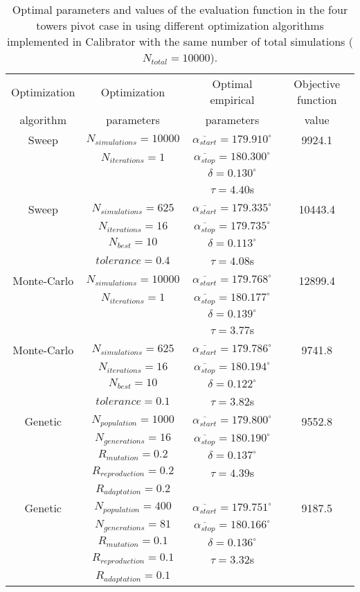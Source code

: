 \documentclass[review,authoryear]{elsarticle}
\newcommand{\TABLE}[5]
{
	\begin{table}[ht!]
		\centering
		\caption{#4.\label{#5}}
		#1
		\begin{tabular}{#2}
			#3
		\end{tabular}
	\end{table}
}
\begin{document}
\TABLE{\scriptsize}{cccc}
{
	Optimization & Optimization & Optimal empirical & Objective function
	\\ algorithm & parameters & parameters & value
	\\ \hline
	Sweep & $N_{simulations}=10000$ & $\overline{\alpha_{start}}=179.910^\circ$
	& 9924.1
	\\ & $N_{iterations}=1$ & $\overline{\alpha_{stop}}=180.300^\circ$
	\\ & & $\delta=0.130^\circ$
	\\ & & $\tau=4.40$s
	\\ \hline
	Sweep & $N_{simulations}=625$ & $\overline{\alpha_{start}}=179.335^\circ$
	& 10443.4
	\\ & $N_{iterations}=16$ & $\overline{\alpha_{stop}}=179.735^\circ$
	\\ & $N_{best}=10$ & $\delta=0.113^\circ$
	\\ & $tolerance=0.4$ & $\tau=4.08$s
	\\ \hline
	Monte-Carlo & $N_{simulations}=10000$
	& $\overline{\alpha_{start}}=179.768^\circ$ & 12899.4
	\\ & $N_{iterations}=1$ & $\overline{\alpha_{stop}}=180.177^\circ$
	\\ & & $\delta=0.139^\circ$
	\\ & & $\tau=3.77$s
	\\ \hline
	Monte-Carlo & $N_{simulations}=625$
	& $\overline{\alpha_{start}}=179.786^\circ$ & 9741.8
	\\ & $N_{iterations}=16$ & $\overline{\alpha_{stop}}=180.194^\circ$
	\\ & $N_{best}=10$ & $\delta=0.122^\circ$
	\\ & $tolerance=0.1$ & $\tau=3.82$s
	\\ \hline
	Genetic & $N_{population}=1000$ & $\overline{\alpha_{start}}=179.800^\circ$
	& 9552.8
	\\ & $N_{generations}=16$ & $\overline{\alpha_{stop}}=180.190^\circ$
	\\ & $R_{mutation}=0.2$ & $\delta=0.137^\circ$
	\\ & $R_{reproduction}=0.2$ & $\tau=4.39$s
	\\ & $R_{adaptation}=0.2$
	\\ \hline
	Genetic & $N_{population}=400$ & $\overline{\alpha_{start}}=179.751^\circ$
	& 9187.5
	\\ & $N_{generations}=81$ & $\overline{\alpha_{stop}}=180.166^\circ$
	\\ & $R_{mutation}=0.1$ & $\delta=0.136^\circ$
	\\ & $R_{reproduction}=0.1$ & $\tau=3.32$s
	\\ & $R_{adaptation}=0.1$
	\\ \hline
}{Optimal parameters and values of the evaluation function in the four towers pivot case in \citet{Ouazaa15} using different optimization algorithms implemented in Calibrator with the same number of total simulations ($N_{total}=10000$)}{TabPivot}
\end{document}
